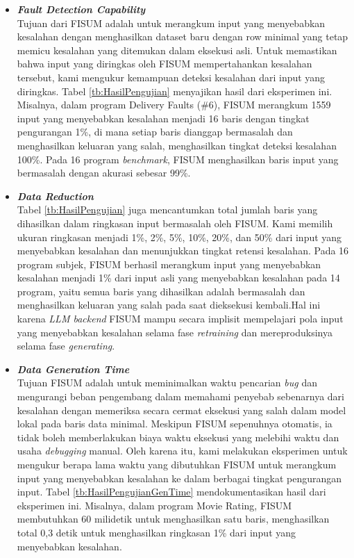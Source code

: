 \begin{itemize}
  \item \emph{\textbf{Fault Detection Capability}} \\
  Tujuan dari FISUM adalah untuk merangkum input yang 
  menyebabkan kesalahan dengan menghasilkan dataset baru 
  dengan row minimal yang tetap memicu 
  kesalahan yang ditemukan dalam 
  eksekusi asli. Untuk memastikan bahwa input yang 
  diringkas oleh FISUM mempertahankan kesalahan tersebut, 
  kami mengukur kemampuan deteksi kesalahan dari input 
  yang diringkas. Tabel \ref{tb:HasilPengujian} menyajikan 
  hasil dari eksperimen ini. 
  Misalnya, dalam program Delivery Faults (\#6), 
  FISUM merangkum 1559 input yang menyebabkan kesalahan 
  menjadi 16 baris dengan tingkat pengurangan 1\%, 
  di mana setiap baris dianggap bermasalah dan menghasilkan 
  keluaran yang salah, menghasilkan tingkat deteksi 
  kesalahan 100\%. Pada 16 program \emph{benchmark}, 
  FISUM menghasilkan baris input yang bermasalah dengan
  akurasi sebesar 99\%.

  \item \emph{\textbf{Data Reduction}} \\
  Tabel \ref{tb:HasilPengujian} juga mencantumkan total 
  jumlah baris yang dihasilkan dalam ringkasan input 
  bermasalah oleh FISUM. Kami memilih ukuran ringkasan 
  menjadi 1\%, 2\%, 5\%, 10\%, 20\%, dan 50\% dari 
  input yang menyebabkan kesalahan dan menunjukkan 
  tingkat retensi kesalahan. Pada 16 program subjek, 
  FISUM berhasil merangkum input yang menyebabkan 
  kesalahan menjadi 1\% dari input asli yang menyebabkan 
  kesalahan pada 14 program, yaitu semua baris yang 
  dihasilkan adalah bermasalah dan 
  menghasilkan keluaran yang salah pada saat dieksekusi
  kembali.Hal ini karena \emph{LLM backend} 
  FISUM mampu secara implisit mempelajari pola 
  input yang menyebabkan kesalahan 
  selama fase \emph{retraining} dan mereproduksinya selama 
  fase \emph{generating}.
  
  \item \emph{\textbf{Data Generation Time}} \\
  Tujuan FISUM adalah untuk meminimalkan waktu 
  pencarian \emph{bug} dan mengurangi beban pengembang 
  dalam memahami penyebab sebenarnya dari kesalahan 
  dengan memeriksa secara cermat eksekusi yang salah 
  dalam model lokal pada baris data minimal. Meskipun FISUM 
  sepenuhnya otomatis, ia tidak boleh memberlakukan 
  biaya waktu eksekusi yang melebihi waktu dan usaha 
  \emph{debugging} manual. Oleh karena itu, kami melakukan 
  eksperimen untuk mengukur berapa lama waktu yang 
  dibutuhkan FISUM untuk merangkum input yang menyebabkan 
  kesalahan ke dalam berbagai tingkat pengurangan input. 
  Tabel \ref{tb:HasilPengujianGenTime}
  mendokumentasikan hasil dari eksperimen ini. 
  Misalnya, dalam program Movie Rating, FISUM 
  membutuhkan 60 milidetik untuk menghasilkan satu baris, 
  menghasilkan total 0,3 detik untuk menghasilkan 
  ringkasan 1\% dari input yang menyebabkan kesalahan.
  

\end{itemize}
